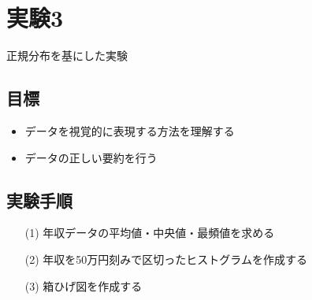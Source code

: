 \documentclass[12pt]{jarticle}
\begin{document}
\section{実験3}
正規分布を基にした実験

\subsection{目標}
\begin{itemize}
    \item データを視覚的に表現する方法を理解する
    \item データの正しい要約を行う
\end{itemize}

\subsection{実験手順}
\begin{itemize}
    \item[(1)] 年収データの平均値・中央値・最頻値を求める
    \item[(2)] 年収を50万円刻みで区切ったヒストグラムを作成する
    \item[(3)] 箱ひげ図を作成する
\end{itemize}
\end{document}
